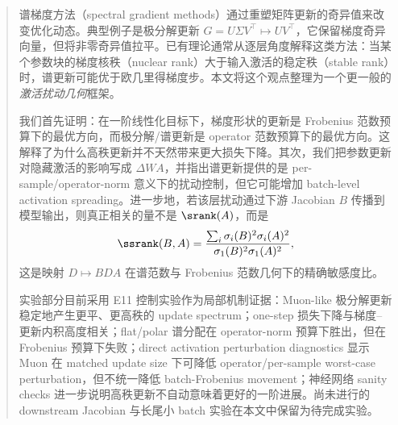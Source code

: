 \begin{abstract}
谱梯度方法（spectral gradient methods）通过重塑矩阵更新的奇异值来改变优化动态。典型例子是极分解更新
\(G=U\Sigma V^\top\mapsto UV^\top\)，它保留梯度奇异向量，但将非零奇异值拉平。已有理论通常从逐层角度解释这类方法：当某个参数块的梯度核秩（nuclear rank）大于输入激活的稳定秩（stable rank）时，谱更新可能优于欧几里得梯度步。本文将这个观点整理为一个更一般的\emph{激活扰动几何}框架。

我们首先证明：在一阶线性化目标下，梯度形状的更新是 Frobenius 范数预算下的最优方向，而极分解/谱更新是 operator 范数预算下的最优方向。这解释了为什么高秩更新并不天然带来更大损失下降。其次，我们把参数更新对隐藏激活的影响写成 \(\Delta W A\)，并指出谱更新提供的是 per-sample/operator-norm 意义下的扰动控制，但它可能增加 batch-level activation spreading。进一步地，若该层扰动通过下游 Jacobian \(B\) 传播到模型输出，则真正相关的量不是 \(\srank(A)\)，而是
\[
\ssrank(B,A)=
\frac{\sum_i \sigma_i(B)^2\sigma_i(A)^2}{\sigma_1(B)^2\sigma_1(A)^2},
\]
这是映射 \(D\mapsto BDA\) 在谱范数与 Frobenius 范数几何下的精确敏感度比。

实验部分目前采用 E11 控制实验作为局部机制证据：Muon-like 极分解更新稳定地产生更平、更高秩的 update spectrum；one-step 损失下降与梯度--更新内积高度相关；flat/polar 谱分配在 operator-norm 预算下胜出，但在 Frobenius 预算下失败；direct activation perturbation diagnostics 显示 Muon 在 matched update size 下可降低 operator/per-sample worst-case perturbation，但不统一降低 batch-Frobenius movement；神经网络 sanity checks 进一步说明高秩更新不自动意味着更好的一阶进展。尚未进行的 downstream Jacobian 与长尾小 batch 实验在本文中保留为待完成实验。
\end{abstract}
